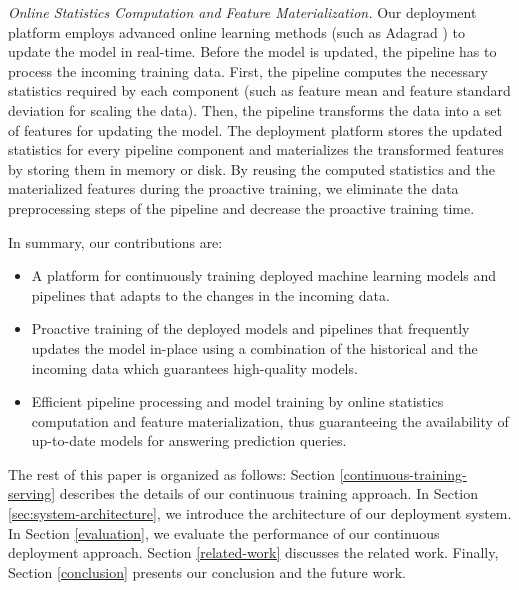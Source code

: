 \textit{Online Statistics Computation and Feature Materialization.}
Our deployment platform employs advanced online learning methods (such as Adagrad \cite{duchi2011adaptive}) to update the model in real-time.
Before the model is updated, the pipeline has to process the incoming training data.
First, the pipeline computes the necessary statistics required by each component (such as feature mean and feature standard deviation for scaling the data).
Then, the pipeline transforms the data into a set of features for updating the model. 
The deployment platform stores the updated statistics for every pipeline component and materializes the transformed features by storing them in memory or disk.
By reusing the computed statistics and the materialized features during the proactive training, we eliminate the data preprocessing steps of the pipeline and decrease the proactive training time.

In summary, our contributions are:
\begin{itemize}
\item A platform for continuously training deployed machine learning models and pipelines that adapts to the changes in the incoming data.
\item Proactive training of the deployed models and pipelines that frequently updates the model in-place using a combination of the historical and the incoming data which guarantees high-quality models.
\item Efficient pipeline processing and model training by online statistics computation and feature materialization, thus guaranteeing the availability of up-to-date models for answering prediction queries.
\end{itemize}

The rest of this paper is organized as follows:
Section \ref{continuous-training-serving} describes the details of our continuous training approach.
In Section \ref{sec:system-architecture}, we introduce the architecture of our deployment system.
In Section \ref{evaluation}, we evaluate the performance of our continuous deployment approach.
Section \ref {related-work} discusses the related work.
Finally, Section \ref{conclusion} presents our conclusion and the future work.